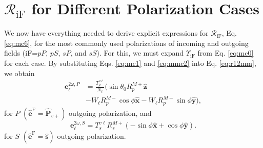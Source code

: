 \documentclass[aps,prb,10pt,showpacs,letterpaper,twocolumn]{revtex4-1}
\begin{document}
\section{\texorpdfstring{$\mathcal{R}_{\mathrm{iF}}$}{R} for Different
Polarization Cases}\label{sec:rcases}

We now have everything needed to derive explicit expressions for
$\mathcal{R}_{\mathrm{iF}}$, Eq. \eqref{eq:mc6}, for the most commonly used
polarizations of incoming and outgoing fields (iF=$pP$, $pS$, $sP$, and $sS$).
For this, we must expand $\Upsilon_{\mathrm{iF}}$ from Eq. \eqref{eq:mc0} for
each case. By substituting Eqs. \eqref{eq:mc1} and \eqref{eq:mmc2} into Eq.
\eqref{eq:r12mm}, we obtain
\begin{equation}\label{eq:e2wpmr}
\begin{split}
\mathbf{e}^{2\omega,P}_{\ell} &=
\frac{T^{v\ell}_{p}}{N_{\ell}}
\big(
  \sin\theta_{0}R^{M+}_{p}\hat{\mathbf{z}}\\
&- W_{\ell}R^{M-}_{p}\cos\phi\hat{\mathbf{x}}
- W_{\ell}R^{M-}_{p}\sin\phi\hat{\mathbf{y}}
\big),
\end{split}
\end{equation}
for $P$ $(\hat{\mathbf{e}}^{\mathrm{F}} = \hat{\mathbf{P}}_{v+})$ outgoing
polarization, and
\begin{equation}\label{eq:e2wsmr}
\mathbf{e}^{2\omega,S}_{\ell} =
T_{s}^{v\ell}R^{M+}_{s}
\left(
- \sin\phi\hat{\mathbf{x}}
+ \cos\phi\hat{\mathbf{y}}
\right).
\end{equation}
for $S$ $(\hat{\mathbf{e}}^{\mathrm{F}} = \hat{\mathbf{s}})$ outgoing
polarization.
\end{document}
